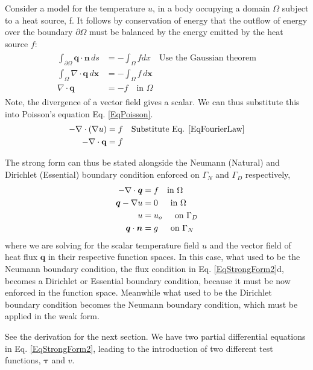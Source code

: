 \documentclass[12pt,3p]{article}
\begin{document}
Consider a model for the temperature $u$, in a body occupying a domain $\Omega$ subject to a heat source, f. It follows by conservation of energy that the outflow of energy over the boundary $\partial \Omega$ must be balanced by the energy emitted by the heat source $f$: 
\begin{align}\label{EqProbDef2}
\begin{split}
\int_{\partial \Omega} \bm{q} \cdot \mathbf{n} \, d {s} &= - \int_{\Omega} f d {x} \quad \text{Use the Gaussian theorem} \\
\int_{\Omega} \nabla \cdot \bm{q} \, d\mathbf{x} &= - \int_{\Omega} f \, d \mathbf{x} \\
\nabla \cdot \bm{q} &= - f \quad \text{in } \Omega
\end{split}
\end{align}
Note, the divergence of a vector field gives a scalar. We can thus substitute this into Poisson's equation Eq. \ref{EqPoisson}. 
\begin{align*}
- \nabla \cdot (\nabla u) &= f \quad \text{Substitute Eq. \ref{EqFourierLaw}} \\
- \nabla \cdot \mathbf{q}  &= f
\end{align*}

The strong form can thus be stated alongside the Neumann (Natural) and Dirichlet (Essential) boundary condition enforced on $\Gamma_N$ and $\Gamma_D$ respectively, 
\begin{subequations}\label{EqStrongForm2}
\begin{align}
- \nabla \cdot \bm{q} &= f \quad \text{in } \Omega \\
\bm{q} - \nabla u &= 0 \indent \text{in } \Omega \\
u &= u_o \indent \text{on } \Gamma_D \\
\bm{q} \cdot \bm{n} &= g \indent \text{on } \Gamma_N
\end{align}
\end{subequations}
where we are solving for the scalar temperature field $u$ and the vector field of heat flux $\mathbf{q}$ in their respective function spaces. In this case, what used to be the Neumann boundary condition, the flux condition in Eq. \ref{EqStrongForm2}d, becomes a Dirichlet or Essential boundary condition, because it must be now enforced in the function space. Meanwhile what used to be the Dirichlet boundary condition becomes the Neumann boundary condition, which must be applied in the weak form. 

See the derivation for the next section. We have two partial differential equations in Eq. \ref{EqStrongForm2}, leading to the introduction of two different test functions, $\bm{\tau}$ and $v$. 
\end{document}
